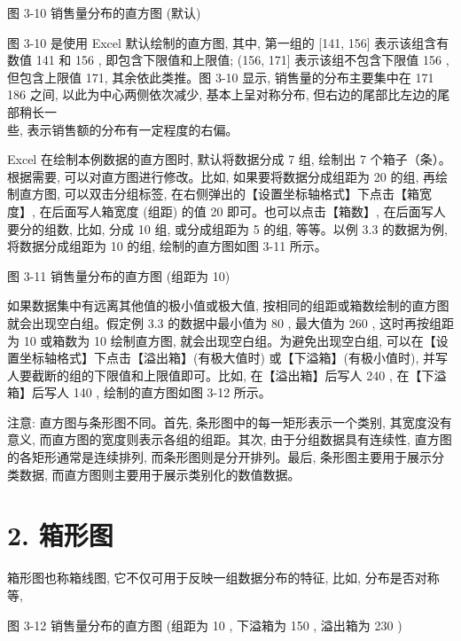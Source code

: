 \documentclass[10pt]{article}
\begin{document}
\begin{CJK*}{UTF8}{bsmi}
\begin{center}
\end{center}

图 3-10 销售量分布的直方图 (默认)

图 3-10 是使用 Excel 默认绘制的直方图, 其中, 第一组的 [141, 156] 表示该组含有数值 141 和 156 , 即包含下限值和上限值; (156, 171] 表示该组不包含下限值 156 , 但包含上限值 171, 其余依此类推。图 3-10 显示, 销售量的分布主要集中在 171 186 之间, 以此为中心两侧依次减少, 基本上呈对称分布, 但右边的尾部比左边的尾部稍长一\\
些, 表示销售额的分布有一定程度的右偏。

Excel 在绘制本例数据的直方图时, 默认将数据分成 7 组, 绘制出 7 个箱子（条）。根据需要, 可以对直方图进行修改。比如, 如果要将数据分成组距为 20 的组, 再绘制直方图, 可以双击分组标签, 在右侧弹出的【设置坐标轴格式】下点击【箱宽度】, 在后面写人箱宽度 (组距) 的值 20 即可。也可以点击【箱数】, 在后面写人要分的组数, 比如, 分成 10 组, 或分成组距为 5 的组, 等等。以例 3.3 的数据为例, 将数据分成组距为 10 的组, 绘制的直方图如图 3-11 所示。

\begin{center}
\end{center}

图 3-11 销售量分布的直方图 (组距为 10)

如果数据集中有远离其他值的极小值或极大值, 按相同的组距或箱数绘制的直方图就会出现空白组。假定例 3.3 的数据中最小值为 80 , 最大值为 260 , 这时再按组距为 10 或箱数为 10 绘制直方图, 就会出现空白组。为避免出现空白组, 可以在【设置坐标轴格式】下点击【溢出箱】(有极大值时) 或【下溢箱】(有极小值时), 并写人要截断的组的下限值和上限值即可。比如, 在【溢出箱】后写人 240 , 在【下溢箱】后写人 140 , 绘制的直方图如图 3-12 所示。

注意: 直方图与条形图不同。首先, 条形图中的每一矩形表示一个类别, 其宽度没有意义, 而直方图的宽度则表示各组的组距。其次, 由于分组数据具有连续性, 直方图的各矩形通常是连续排列, 而条形图则是分开排列。最后, 条形图主要用于展示分类数据, 而直方图则主要用于展示类别化的数值数据。

\section*{2. 箱形图}
箱形图也称箱线图, 它不仅可用于反映一组数据分布的特征, 比如, 分布是否对称等,

\begin{center}
\end{center}

图 3-12 销售量分布的直方图 (组距为 10 , 下溢箱为 150 , 溢出箱为 230 )


\end{CJK*}
\end{document}
